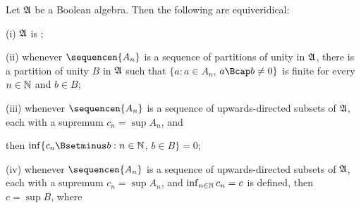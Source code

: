 
 Let $\frak A$ be a Boolean algebra.
Then the following are equiveridical:

(i) $\frak A$ is \wsid;

(ii) whenever
$\sequencen{A_n}$ is a sequence of partitions of unity in $\frak A$,
there is a partition of unity $B$ in $\frak A$ such that
$\{a:a\in A_n$, $a\Bcap b\ne 0\}$ is finite for every $n\in\Bbb N$ and
$b\in B$;

(iii) whenever $\sequencen{A_n}$ is a sequence of upwards-directed
subsets of $\frak A$, each with a supremum $c_n=\sup A_n$, and


\noindent then $\inf\{c_n\Bsetminus b:n\in\Bbb N$, $b\in B\}=0$;

(iv) whenever $\sequencen{A_n}$ is a sequence of upwards-directed
subsets of $\frak A$, each with a supremum $c_n=\sup A_n$, and
$\inf_{n\in\Bbb N}c_n=c$ is defined, then $c=\sup B$, where


